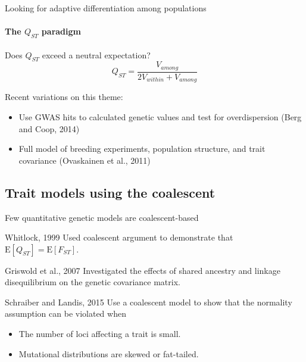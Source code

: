 \documentclass{beamer}
\newcommand{\E}{\mathrm{E}}
\begin{document}
\begin{frame}{Looking for adaptive differentiation among populations}
  \framesubtitle{The $Q_{ST}$ paradigm}
  \begin{block}{Does $Q_{ST}$ exceed a neutral expectation?}
    \begin{equation*}
    Q_{ST} = \frac{V_{among}}{2V_{within}+V_{among}}
    \end{equation*}
  \end{block}
  Recent variations on this theme:
  \begin{itemize}
  \item Use GWAS hits to calculated genetic values and test for overdispersion
    (Berg and Coop, 2014)
  \item Full model of breeding experiments, population structure, and trait
    covariance (Ovaskainen et al., 2011)
  \end{itemize}
\end{frame}

\subsection{Trait models using the coalescent}

\begin{frame}{Few quantitative genetic models are coalescent-based}
  \begin{block}{Whitlock, 1999}
    Used coalescent argument to demonstrate that $\E[Q_{ST}]=\E[F_{ST}]$. 
  \end{block}
  \begin{block}{Griswold et al., 2007}
    Investigated the effects of shared ancestry and linkage disequilibrium on
    the genetic covariance matrix. 
  \end{block}
  \begin{block}{Schraiber and Landis, 2015}
    Use a coalescent model to show that the normality assumption can be violated
    when
    \begin{itemize}
    \item The number of loci affecting a trait is small.
    \item Mutational distributions are skewed or fat-tailed.
    \end{itemize}
  \end{block}
\end{frame}
\end{document}
